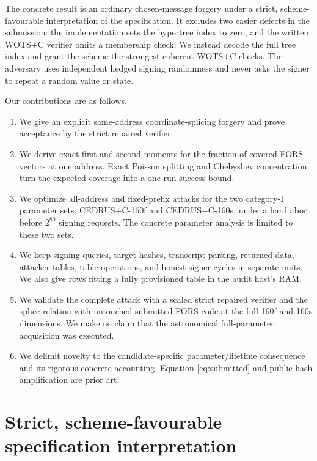 \documentclass[11pt,a4paper]{article}
\begin{document}
The concrete result is an ordinary chosen-message forgery under a strict,
scheme-favourable interpretation of the specification.  It excludes two easier
defects in the submission: the implementation
sets the hypertree index to zero, and the written WOTS+C verifier omits a
membership check.  We instead decode the full tree index and grant the scheme
the strongest coherent WOTS+C checks.  The adversary uses independent hedged
signing randomness and never asks the signer to repeat a random value or state.

Our contributions are as follows.
\begin{enumerate}[leftmargin=*,itemsep=2pt]
  \item We give an explicit same-address coordinate-splicing forgery and prove
        acceptance by the strict repaired verifier.
  \item We derive exact first and second moments for the fraction of covered
        FORS vectors at one address.  Exact Poisson splitting and Chebyshev
        concentration turn the expected coverage into a one-run success bound.
  \item We optimize all-address and fixed-prefix attacks for the two
        category-I parameter sets, CEDRUS+C-160f and CEDRUS+C-160s, under a
        hard abort before $2^{80}$ signing requests.  The concrete parameter
        analysis is limited to these two sets.
  \item We keep signing queries, target hashes, transcript parsing, returned
        data, attacker tables, table operations, and honest-signer cycles in
        separate units.  We also give rows fitting a fully provisioned table
        in the audit host's RAM.
  \item We validate the complete attack with a scaled strict repaired verifier
        and the splice relation with untouched submitted FORS code at the full
        160f and 160s dimensions.  We make no claim that the astronomical
        full-parameter acquisition was executed.
  \item We delimit novelty to the candidate-specific parameter/lifetime
        consequence and its rigorous concrete accounting.  Equation
        \eqref{eq:submitted} and public-hash amplification are prior art.
\end{enumerate}

\section{Strict, scheme-favourable specification interpretation}
\end{document}
